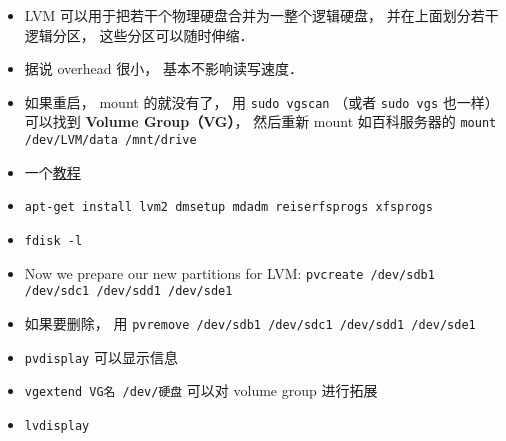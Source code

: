 
\begin{issues}
\issueDraft
\end{issues}


\begin{itemize}
\item LVM 可以用于把若干个物理硬盘合并为一整个逻辑硬盘， 并在上面划分若干逻辑分区， 这些分区可以随时伸缩．
\item 据说 overhead 很小， 基本不影响读写速度．
\item 如果重启， mount 的就没有了， 用 \verb`sudo vgscan` （或者 \verb|sudo vgs| 也一样）可以找到 \textbf{Volume Group（VG）}， 然后重新 mount 如百科服务器的 \verb`mount /dev/LVM/data /mnt/drive`
\end{itemize}

\begin{itemize}
\item 一个\href{https://www.howtoforge.com/linux_lvm}{教程}
\item \verb|apt-get install lvm2 dmsetup mdadm reiserfsprogs xfsprogs|
\item \verb|fdisk -l|
\item Now we prepare our new partitions for LVM: \verb|pvcreate /dev/sdb1 /dev/sdc1 /dev/sdd1 /dev/sde1|
\item 如果要删除， 用 \verb|pvremove /dev/sdb1 /dev/sdc1 /dev/sdd1 /dev/sde1|
\item \verb|pvdisplay| 可以显示信息
\item \verb|vgextend VG名 /dev/硬盘| 可以对 volume group 进行拓展
\item \verb|lvdisplay|
\end{itemize}

